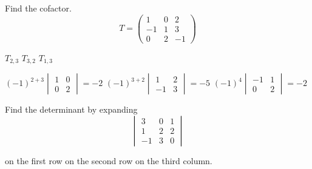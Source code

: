\begin{exercises}
  \recommended \item 
    Find the cofactor.
    \begin{equation*}
      T=\begin{pmatrix}
          1  &0  &2  \\
         -1  &1  &3  \\
          0  &2  &-1
        \end{pmatrix}
    \end{equation*}
    \begin{exparts*}
       \partsitem \( T_{2,3} \)
       \partsitem \( T_{3,2} \)
       \partsitem \( T_{1,3} \)
    \end{exparts*}
    \begin{answer}
      \begin{exparts*}
       \partsitem \( (-1)^{2+3}\begin{vmatrix}
                            1  &0  \\
                            0  &2
                          \end{vmatrix}=-2  \)
       \partsitem \( (-1)^{3+2}\begin{vmatrix}
                            1  &2  \\
                           -1  &3
                          \end{vmatrix}=-5  \)
       \partsitem \( (-1)^{4}\begin{vmatrix}
                           -1  &1  \\
                            0  &2
                          \end{vmatrix}=-2  \)
      \end{exparts*}  
    \end{answer}
  \recommended \item 
    Find the determinant
    by expanding
    \begin{equation*}
      \begin{vmatrix}
         3  &0  &1  \\
         1  &2  &2  \\
        -1  &3  &0
      \end{vmatrix}
    \end{equation*}
    \begin{exparts*}
      \partsitem on the first row
      \partsitem on the second row
      \partsitem on the third column.
    \end{exparts*}
    \begin{answer}

\end{answer}
\end{exercises}
